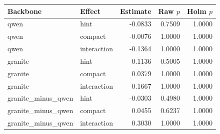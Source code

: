 \begin{tabular}{llrrr}
Backbone & Effect & Estimate & Raw $p$ & Holm $p$ \\
\hline
qwen & hint & -0.0833 & 0.7509 & 1.0000 \\
qwen & compact & -0.0076 & 1.0000 & 1.0000 \\
qwen & interaction & -0.1364 & 1.0000 & 1.0000 \\
granite & hint & -0.1136 & 0.5005 & 1.0000 \\
granite & compact & 0.0379 & 1.0000 & 1.0000 \\
granite & interaction & 0.1667 & 1.0000 & 1.0000 \\
granite_minus_qwen & hint & -0.0303 & 0.4980 & 1.0000 \\
granite_minus_qwen & compact & 0.0455 & 0.6237 & 1.0000 \\
granite_minus_qwen & interaction & 0.3030 & 1.0000 & 1.0000 \\
\end{tabular}
